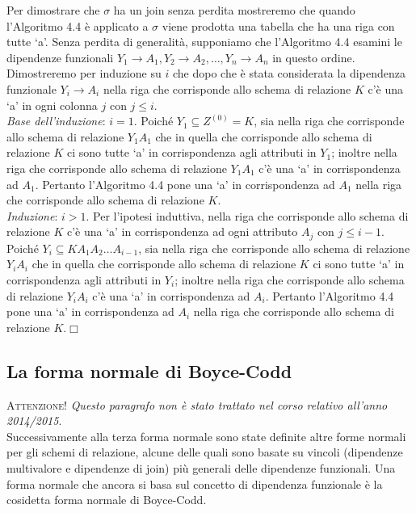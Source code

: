 Per dimostrare che $\sigma$ ha un join senza perdita mostreremo che quando l'Algoritmo 4.4 è applicato a $\sigma$
viene prodotta una tabella che ha una riga con tutte `a'. Senza perdita di generalità, supponiamo che l'Algoritmo 4.4
esamini le dipendenze funzionali $Y_1 \rightarrow A_1, Y_2 \rightarrow A_2, \ldots, Y_n \rightarrow A_n$ in questo ordine.
Dimostreremo per induzione su $i$ che dopo che è stata considerata la dipendenza funzionale $Y_i \rightarrow A_i$ nella 
riga che corrisponde allo schema di relazione $K$ c'è una `a' in ogni colonna $j$ con $j \leq i$.\\
\emph{Base dell'induzione}: $i=1$. Poiché $Y_1 \subseteq Z^{(0)} = K$, sia nella riga che corrisponde allo schema di
relazione $Y_1A_1$ che in quella che corrisponde allo schema di relazione $K$ ci sono tutte `a' in corrispondenza
agli attributi in $Y_1$; inoltre nella riga che corrisponde allo schema di relazione $Y_1A_1$ c'è una `a' in
corrispondenza ad $A_1$. Pertanto l'Algoritmo 4.4 pone una `a' in corrispondenza ad $A_1$ nella riga che corrisponde 
allo schema di relazione $K$.\\ 
\emph{Induzione}: $i > 1$. Per l'ipotesi induttiva, nella riga che corrisponde allo schema di relazione $K$ c'è una
`a' in corrispondenza ad ogni attributo $A_j$ con $j \leq i-1$. Poiché $Y_i \subseteq KA_1A_2\ldots A_{i-1}$, sia nella
riga che corrisponde allo schema di relazione $Y_iA_i$ che in quella che corrisponde allo schema di relazione $K$ ci sono
tutte `a' in corrispondenza agli attributi in $Y_i$; inoltre nella riga che corrisponde allo schema di relazione $Y_iA_i$
c'è una `a' in corrispondenza ad $A_i$. Pertanto l'Algoritmo 4.4 pone una `a' in corrispondenza ad $A_i$ nella riga che 
corrisponde allo schema di relazione $K$.\hfill $\Box$
\subsection{La forma normale di Boyce-Codd}
\textsc{Attenzione!} \emph{Questo paragrafo non è stato trattato nel corso relativo all'anno 2014/2015}.\\

\noindent Successivamente alla terza forma normale sono state definite altre forme normali per gli schemi di relazione, alcune delle 
quali sono basate su vincoli (dipendenze multivalore e dipendenze di join) più generali delle dipendenze funzionali. Una 
forma normale che ancora si basa sul concetto di dipendenza funzionale è la cosidetta forma normale di Boyce-Codd.

